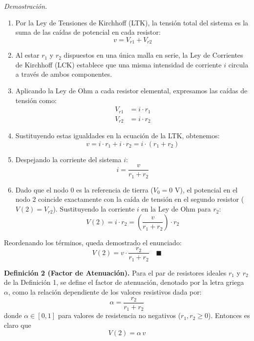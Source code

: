 \documentclass[11pt, a4paper]{article}
\theoremstyle{definition}
\theoremstyle{plain}
\theoremstyle{plain}
\theoremstyle{remark}
\theoremstyle{remark}
\theoremstyle{remark}
\begin{document}
\textit{Demostración.}
\begin{enumerate}
	\item Por la Ley de Tensiones de Kirchhoff (LTK), la tensión total del sistema es la suma de las caídas de potencial en cada resistor:
	\begin{equation*}
		v = V_{r1} + V_{r2}
	\end{equation*}
	
	\item Al estar $r_1$ y $r_2$ dispuestos en una única malla en serie, la Ley de Corrientes de Kirchhoff (LCK) establece que una misma intensidad de corriente $i$ circula a través de ambos componentes.
	
	\item Aplicando la Ley de Ohm a cada resistor elemental, expresamos las caídas de tensión como:
	\begin{align*}
		V_{r1} &= i \cdot r_1 \\
		V_{r2} &= i \cdot r_2
	\end{align*}
	
	\item Sustituyendo estas igualdades en la ecuación de la LTK, obtenemos:
	\begin{equation*}
		v = i \cdot r_1 + i \cdot r_2 = i \cdot (r_1 + r_2)
	\end{equation*}
	
	\item Despejando la corriente del sistema $i$:
	\begin{equation*}
		i = \frac{v}{r_1 + r_2}
	\end{equation*}
	
	\item Dado que el nodo $0$ es la referencia de tierra ($V_{0} = 0\text{ V}$), el potencial en el nodo $2$ coincide exactamente con la caída de tensión en el segundo resistor ($V(2) = V_{r2}$). Sustituyendo la corriente $i$ en la Ley de Ohm para $r_2$:
	\begin{equation*}
		V(2) = i \cdot r_2 = \left( \frac{v}{r_1 + r_2} \right) \cdot r_2
	\end{equation*}
\end{enumerate}
Reordenando los términos, queda demostrado el enunciado:
\begin{equation*}
	V(2) = v \cdot \frac{r_2}{r_1 + r_2} \quad \blacksquare
\end{equation*}

\textbf{Definición 2 (Factor de Atenuación).} 
Para el par de resistores ideales $r_1$ y $r_2$ de la Definición 1, se define el factor de atenuación, denotado por la letra griega $\alpha$, como la relación dependiente de los valores resistivos dada por:
\begin{equation}
	\alpha = \frac{r_2}{r_1 + r_2}
\end{equation}
donde $\alpha \in [0, 1]$ para valores de resistencia no negativos ($r_1, r_2 \geq 0$). Entonces es claro que
\[
V(2) = \alpha\, v  
\] 
\end{document}

